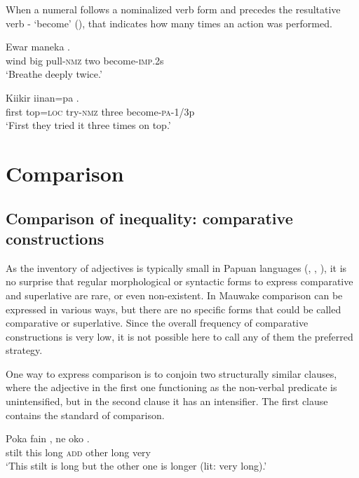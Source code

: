 When a numeral follows a nominalized verb form and precedes the resultative verb - `become' (), that indicates how many times an action was performed. 

\ea%
\label{ex:x1305}
\gll Ewar  maneka      . \\
wind  big  pull-\textsc{nmz}  two  become-\textsc{imp}.2s\\
\glt `Breathe deeply twice.'
\z

\ea%
\label{ex:x1306}
\gll Kiikir  iinan=pa     . \\
first  top=\textsc{loc}  try-\textsc{nmz}  three  become-\textsc{pa}-1/3p\\
\glt `First they tried it three times on top.'
\z

\section{Comparison}
{}
\subsection{Comparison of inequality: comparative constructions}
{}
As the inventory of adjectives is typically small in Papuan languages (\citealt[268]{Haiman1980}, \citealt[63]{Reesink1987}, \citealt[105--107]{MacDonald1990}), it is no surprise that regular morphological or syntactic forms to express comparative and superlative are rare, or even non-existent. In Mauwake comparison can be expressed in various ways, but there are no specific forms that could be called comparative or superlative. Since the overall frequency of comparative constructions is very low, it is not possible here to call any of them the preferred strategy.

One way to express comparison is to conjoin two structurally similar clauses, where the adjective in the first one functioning as the non-verbal predicate is unintensified, but in the second clause it has an intensifier. The first clause contains the standard of comparison. 

\ea%
\label{ex:x1336}
\gll Poka  fain  ,  ne  oko    . \\
stilt  this  long  \textsc{add}  other  long  very\\
\glt `This stilt is long but the other one is longer (lit: very long).'
\z

